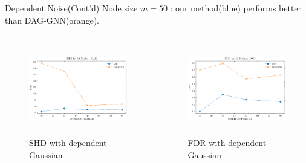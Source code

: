 \documentclass{beamer}
\begin{document}
\begin{frame}{Dependent Noise(Cont'd)}
    Node size $m=50$ : our method(blue) performs better than DAG-GNN(orange).
    \begin{columns}
        \begin{column}{0.5\textwidth}
            \begin{figure}
                \centering
                \includegraphics[height=4cm]{fig/SHD_dependence_50_DAG_threshold0.3.pdf}
                \caption{SHD with dependent Gaussian}
                \label{fig:dep_gaussian_shd_50}
            \end{figure}
        \end{column}
        \begin{column}{0.5\textwidth}
            \begin{figure}
                \centering
                \includegraphics[height=4cm]{fig/FDR_dependence_50_DAG_threshold0.3.pdf}
                \caption{FDR with dependent Gaussian}
                \label{fig:dep_gaussian_fdr_50}
            \end{figure}
        \end{column}
    \end{columns}
\end{frame}
\end{document}
